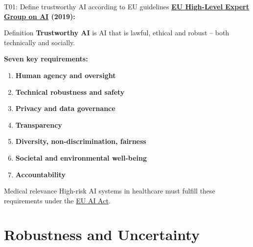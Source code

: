 \documentclass[aspectratio=169, 10pt]{beamer}
\begin{document}
\begin{frame}{T01: Define trustworthy AI according to EU guidelines}
    \textbf{\href{https://digital-strategy.ec.europa.eu/en/policies/expert-group-ai}{EU High-Level Expert Group on AI} (2019):}
    
    \begin{block}{Definition}
        \textbf{Trustworthy AI} is AI that is lawful, ethical and robust -- both technically and socially.
    \end{block}
    
    \vspace{0.2cm}
    \textbf{Seven key requirements:}
    \begin{enumerate}
        \item \textbf{Human agency and oversight}
        \item \textbf{Technical robustness and safety}
        \item \textbf{Privacy and data governance}
        \item \textbf{Transparency}
        \item \textbf{Diversity, non-discrimination, fairness}
        \item \textbf{Societal and environmental well-being}
        \item \textbf{Accountability}
    \end{enumerate}
    
    \vspace{0.1cm}
    {\small
    \begin{alertblock}{Medical relevance}
        High-risk AI systems in healthcare must fulfill these requirements under the \href{https://artificialintelligenceact.eu/}{EU AI Act}.
    \end{alertblock}
    }
\end{frame}

\section{Robustness and Uncertainty}
\end{document}
